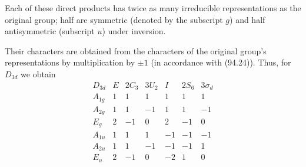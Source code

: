 Each of these direct products has twice as many irreducible representations as the original group; half are symmetric (denoted by the subscript $g$) and half antisymmetric (subscript $u$) under inversion.

Their characters are obtained from the characters of the original group's representations by multiplication by $\pm1$ (in accordance with (94.24)). Thus, for $D_{3d}$ we obtain
\[
\begin{array}{c|rrrrrr}
D_{3d}&E&2C_3&3U_2&I&2S_6&3\sigma_d\\\hline
A_{1g}&1&1&1&1&1&1\\ A_{2g}&1&1&-1&1&1&-1\\ E_g&2&-1&0&2&-1&0\\
A_{1u}&1&1&1&-1&-1&-1\\ A_{2u}&1&1&-1&-1&-1&1\\ E_u&2&-1&0&-2&1&0
\end{array}
\]
